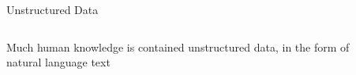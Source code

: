 \documentclass[10pt]{beamer}
\begin{document}
\begin{frame}{Unstructured Data}
\begin{columns}
\begin{column}{0.5\textwidth}
Much human knowledge is contained \alert{unstructured data}, in the form of natural language text
\end{column}
\begin{column}{0.5\textwidth}
\begin{center}
\end{center}
\end{column}
\end{columns}
\end{frame}
\end{document}
